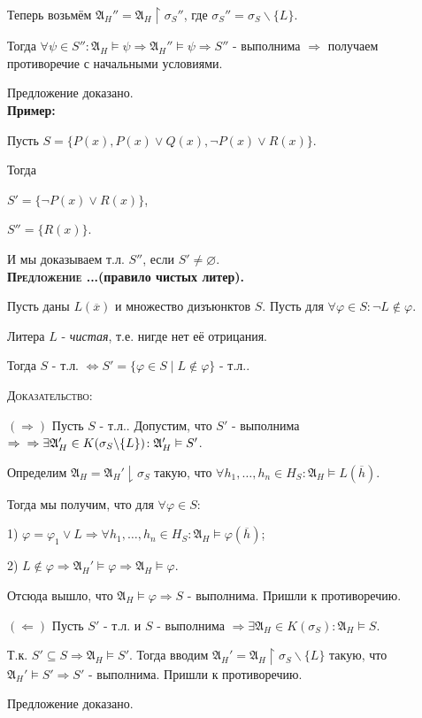 \documentclass[18pt, a4paper]{extarticle}
\newcounter{par}
\newcounter{spar}
\newcounter{zap}
\newcommand{\predlT}[1]{\textbf{\textsc{Предложение \thepar.\if\thespar1\thespar.\fi\thezap.}(#1).}\stepcounter{zap}}
\newcommand{\primer}{\textbf{Пример:\;}}
\newcommand{\mA}{\mathfrak{A}}
\newcommand{\dok}{\textsc{Доказательство:}}
\newcommand{\rightdok}{\boxed{(\Rightarrow)}}
\newcommand{\leftdok}{\boxed{(\Leftarrow)}}
\newcommand{\ovl}[1]{\overline{#1}}
\newcommand{\vp}{\varphi}
\newcommand{\vD}{\vDash}
\newcommand{\sg}{\sigma}
\newcommand{\lot}[3]{#1_#2,\dots,#1_#3}
\begin{document}
Теперь возьмём $\mA_H''=\mA_H\upharpoonright\sg_S''$, где $\sg_S''=\sg_S\backslash\{L\}$.

Тогда $\forall\psi\in S''\!\!:\mA_H\vD\psi\Rightarrow\mA_H''\vD\psi\Rightarrow S''$ - выполнима $\Rightarrow$ получаем противоречие с начальными условиями.

Предложение доказано.\\

\primer

Пусть $S=\{P(x),P(x)\vee Q(x),\lnot P(x)\vee R(x)\}$.

Тогда 

$S'=\{\lnot P(x)\vee R(x)\}$,

$S''=\{R(x)\}$.

И мы доказываем т.л. $S''$, если $S'\neq\varnothing$. \\

\predlT{правило чистых литер}

Пусть даны $L(\ovl x)$ и множество дизъюнктов $S$. Пусть для $\forall\vp\in S\!:\lnot L\notin\vp$.

Литера $L$ - \textit{чистая}, т.е. нигде нет её отрицания.

Тогда $S$ - т.л. $\Leftrightarrow S'=\{\vp\in S\;|\;L\notin\vp\}$ - т.л..

\dok

$\rightdok$ Пусть $S$ - т.л.. Допустим, что $S'$ - выполнима $\Rightarrow\newline\Rightarrow\exists\mA_H'\in K(\sg_S\backslash\{L\})\!:\mA_H'\vD S'$.

Определим $\mA_H=\mA_H'\downharpoonright\sg_S$ такую, что $\forall\lot h 1 n\in H_S\!:\mA_H\vD L(\ovl h)$.

Тогда мы получим, что для $\forall\vp\in S\!:$

1) $\vp=\vp_1\vee L\Rightarrow\forall\lot h 1 n\in H_S\!:\mA_H\vD\vp(\ovl h)$;

2) $L\notin\vp\Rightarrow\mA_H'\vD\vp\Rightarrow\mA_H\vD\vp$.

Отсюда вышло, что $\mA_H\vD\vp\Rightarrow S$ - выполнима. Пришли к противоречию.

$\leftdok$ Пусть $S'$ - т.л. и $S$ - выполнима $\Rightarrow\exists\mA_H\in K(\sg_S)\!:\mA_H\vD S$.

Т.к. $S'\subseteq S\Rightarrow\mA_H\vD S'$. Тогда вводим $\mA_H'=\mA_H\upharpoonright\sg_S\backslash\{L\}$ такую, что $\mA_H'\vD S'\Rightarrow S'$ - выполнима. Пришли к противоречию.

Предложение доказано.
\end{document}
